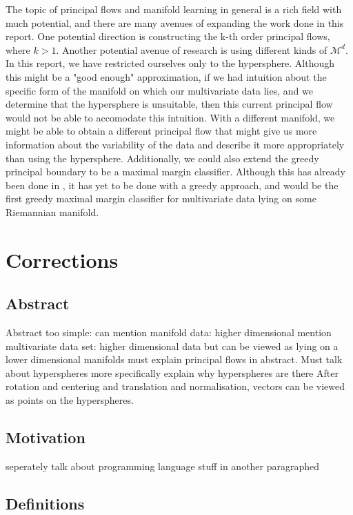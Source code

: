 \documentclass[12pt]{report}
\begin{document}
The topic of principal flows and manifold learning in general is a rich field 
with much potential, and there are many avenues of 
expanding the work done in this report. 
One potential direction is constructing the k-th order principal flows, where $k>1$. 
Another potential avenue of research is using different kinds of $\mathcal{M}^d$. 
In this report, we have restricted ourselves only to the hypersphere. Although this 
might be a "good enough" approximation, if we had intuition about the specific form 
of the manifold on which our multivariate data lies, and we determine that the 
hypersphere is unsuitable, then this current principal flow would not be able to 
accomodate this intuition. With a different manifold, we might be able to obtain 
a different principal flow that might give us more information about the 
variability of the data and describe it more appropriately than using the hypersphere. 
Additionally, we could also extend the greedy principal boundary to be a maximal margin
classifier. Although this has already been done in \cite{principalboundary}, 
it has yet to be done with a greedy approach, and would be the first
greedy maximal margin classifier for multivariate data lying on some 
Riemannian manifold.


\section{Corrections}

\subsection{Abstract}
Abstract too simple: can mention manifold data: higher dimensional mention multivariate
data set: higher dimensional data but can be viewed as lying on a lower dimensional 
manifolds
must explain principal flows in abstract.  
Must talk about hyperspheres more specifically explain why hyperspheres are there
After rotation and centering and translation and normalisation, vectors can be viewed 
as points on the hyperspheres. 

\subsection{Motivation}

seperately talk about programming language stuff in another paragraphed

\subsection{Definitions}
\end{document}
